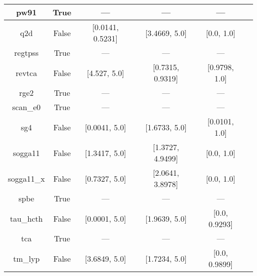 \begin{tabular}{|c|c|c|c|c|l|}
          pw91 &                  True &              --- &              --- &            --- &          \cite{Perdew1991,Perdew1992_6671,Perdew1992_6671_err} \\ \hline
           q2d &                 False & [0.0141, 0.5231] &    [3.4669, 5.0] &     [0.0, 1.0] &                                       \cite{Chiodo2012_126402} \\ \hline
       regtpss &                  True &              --- &              --- &            --- &                                       \cite{Perdew2009_026403} \\ \hline
        revtca &                 False &     [4.527, 5.0] & [0.7315, 0.9319] &  [0.9798, 1.0] &                                        \cite{Tognetti2008_536} \\ \hline
          rge2 &                  True &              --- &              --- &            --- &                                      \cite{Ruzsinszky2009_763} \\ \hline
      scan\_e0 &                  True &              --- &              --- &            --- &                                          \cite{Sun2015_036402} \\ \hline
           sg4 &                 False &    [0.0041, 5.0] &    [1.6733, 5.0] &  [0.0101, 1.0] &                                   \cite{Constantin2016_045126} \\ \hline
       sogga11 &                 False &    [1.3417, 5.0] & [1.3727, 4.9499] &     [0.0, 1.0] &                                       \cite{Peverati2011_1991} \\ \hline
    sogga11\_x &                 False &    [0.7327, 5.0] & [2.0641, 3.8978] &     [0.0, 1.0] &                                     \cite{Peverati2011_191102} \\ \hline
          spbe &                  True &              --- &              --- &            --- &                                        \cite{Swart2009_094103} \\ \hline
     tau\_hcth &                 False &    [0.0001, 5.0] &    [1.9639, 5.0] &  [0.0, 0.9293] &                                          \cite{Boese2002_9559} \\ \hline
           tca &                  True &              --- &              --- &            --- &                                     \cite{Tognetti2008_034101} \\ \hline
       tm\_lyp &                 False &    [3.6849, 5.0] &    [1.7234, 5.0] &  [0.0, 0.9899] &                                      \cite{Thakkar2009_134109} \\ \hline

\end{tabular}
